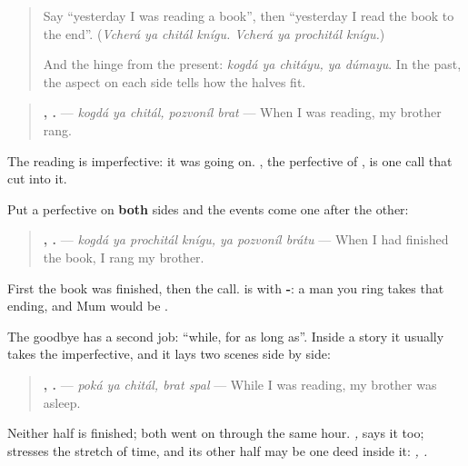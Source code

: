 \label{lesson:RU-C261-poka}



\begin{quote}
Say \textquotedblleft{}yesterday I was reading a book\textquotedblright{}, then \textquotedblleft{}yesterday I read the book to the end\textquotedblright{}. (\emph{Vcherá ya chitál knígu. Vcherá ya prochitál knígu.})

And the hinge from the present: \emph{kogdá ya chitáyu, ya dúmayu}. In the past, the aspect on each side tells how the halves fit.
\end{quote}

\begin{grammarlens}[title={Grammar Lens: one going on, one cutting in}]
\begin{quote}
\textbf{  ,  .} — \emph{kogdá ya chitál, pozvoníl brat} — When I was reading, my brother rang.
\end{quote}

The reading is imperfective: it was going on. \textbf{}, the perfective of \emph{}, is one call that cut into it.

Put a perfective on \textbf{both} sides and the events come one after the other:

\begin{quote}
\textbf{   ,   .} — \emph{kogdá ya prochitál knígu, ya pozvoníl brátu} — When I had finished the book, I rang my brother.
\end{quote}

First the book was finished, then the call. \emph{} is \emph{} with \textbf{-}: a man you ring takes that ending, and Mum would be \emph{}.
\end{grammarlens}

\begin{grammarlens}[title={Grammar Lens: \ru{пока}, for two things at once}]
The goodbye \textbf{} has a second job: \textquotedblleft{}while, for as long as\textquotedblright{}. Inside a story it usually takes the imperfective, and it lays two scenes side by side:

\begin{quote}
\textbf{  ,  .} — \emph{poká ya chitál, brat spal} — While I was reading, my brother was asleep.
\end{quote}

Neither half is finished; both went on through the same hour. \emph{  ,  } says it too; \textbf{} stresses the stretch of time, and its other half may be one deed inside it: \emph{  ,  .}
\end{grammarlens}

